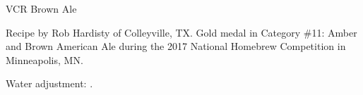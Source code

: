 \documentclass[parskip=half,fontsize=9pt,oneside]{scrbook}
\begin{document}
\mainmatter


\begin{recipe}{VCR Brown Ale}

\begin{aboutblock}
Recipe by Rob Hardisty of Colleyville, TX. Gold medal in Category \#11: Amber and
Brown American Ale during the 2017 National Homebrew Competition in Minneapolis, MN.
\sourceaha
\end{aboutblock}


\begin{methodandtiming}

\begin{mashsteps}
\end{mashsteps}

\begin{fermentationsteps}
\end{fermentationsteps}

\begin{directions}
Water adjustment: .
\end{directions}

\end{methodandtiming}

\recipebreak

\begin{ingredientsblock}

\begin{malts}
\end{malts}

\begin{hops}
\end{hops}


\end{ingredientsblock}

\end{recipe}


\end{document}
